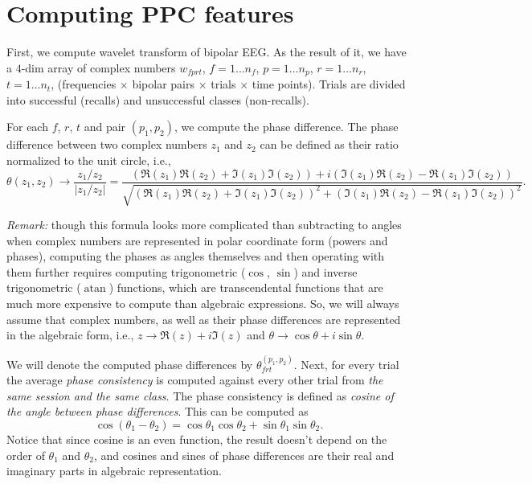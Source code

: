 \documentclass[a4paper]{article}
\DeclareMathOperator{\atan}{atan}
\begin{document}
\section*{Computing PPC features}

First, we compute wavelet transform of bipolar EEG. As the result of it, we have a $4$-dim
array of complex numbers $w_{fprt}$, $f = 1 \ldots n_f$, $p = 1 \ldots n_p$, $r = 1 \ldots n_r$,
$t = 1 \ldots n_t$, (frequencies $\times$ bipolar pairs $\times$ trials $\times$ time points).
Trials are divided into successful (recalls) and unsuccessful classes (non-recalls).

For each $f$, $r$, $t$ and pair $(p_1,p_2)$, we compute the phase difference. The phase
difference between two complex numbers $z_1$ and $z_2$ can be defined as their ratio normalized
to the unit circle, i.e.,
\begin{equation}
\label{eq:phase_diff}
\theta(z_1,z_2) \to \frac{z_1/z_2}{|z_1/z_2|} = \frac{\left(\Re(z_1) \Re(z_2) + \Im(z_1) \Im(z_2)\right) + i \left(\Im(z_1) \Re(z_2) - \Re(z_1) \Im(z_2)\right)}{\sqrt{\left(\Re(z_1) \Re(z_2) + \Im(z_1) \Im(z_2)\right)^2 + \left(\Im(z_1) \Re(z_2) - \Re(z_1) \Im(z_2)\right)^2}}.
\end{equation}

{\em Remark:} though this formula looks more complicated than subtracting to angles when
complex numbers are represented in polar coordinate form (powers and phases), computing
the phases as angles themselves and then operating with them further requires computing
trigonometric ($\cos$, $\sin$) and inverse trigonometric ($\atan$) functions, which are
transcendental functions that are much more expensive to compute than algebraic expressions.
So, we will always assume that complex numbers, as well as their phase differences are
represented in the algebraic form, i.e., $z \to \Re(z) + i \Im(z)$ and
$\theta \to \cos\theta + i \sin\theta$.

We will denote the computed phase differences by $\theta_{frt}^{(p_1,p_2)}$. Next, for every
trial the average {\em phase consistency\/} is computed against every other trial from
{\em the same session and the same class\/}. The phase consistency is defined as
{\em cosine of the angle between phase differences\/}. This can be computed as
\[ \cos(\theta_1-\theta_2) = \cos\theta_1 \cos\theta_2 + \sin\theta_1 \sin\theta_2. \]
Notice that since cosine is an even function, the result doesn't depend on the order of
$\theta_1$ and $\theta_2$, and cosines and sines of phase differences are their real and
imaginary parts in algebraic representation.
\end{document}
